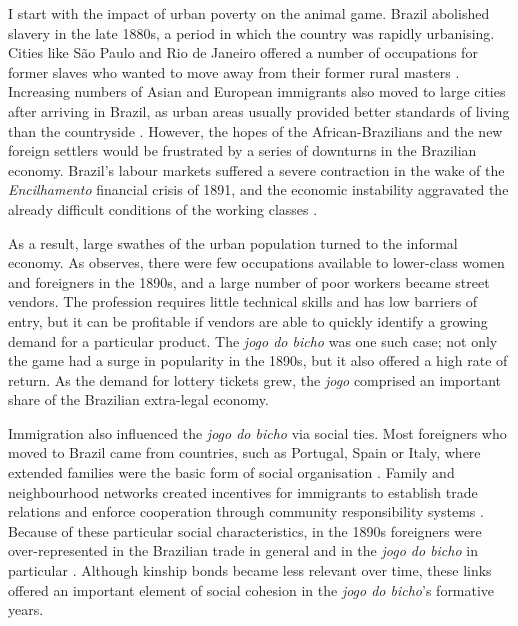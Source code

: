 \documentclass[a4paper,12pt]{article}
\begin{document}
I start with the impact of urban poverty on the animal game. Brazil abolished slavery in the late 1880s, a period in which the country was rapidly urbanising. Cities like São Paulo and Rio de Janeiro offered a number of occupations for former slaves who wanted to move away from their former rural masters \citep{andrews1991blacks, skidmore1993black}. Increasing numbers of Asian and European immigrants also moved to large cities after arriving in Brazil, as urban areas usually provided better standards of living than the countryside \citep{hall1969origins, lesser2013immigration}. However, the hopes of the African-Brazilians and the new foreign settlers would be frustrated by a series of downturns in the Brazilian economy. Brazil's labour markets suffered a severe contraction in the wake of the \textit{Encilhamento} financial crisis of 1891, and the economic instability aggravated the already difficult conditions of the working classes \citep{topik2014political, triner2005baring}.

As a result, large swathes of the urban population turned to the informal economy. As \citet[115]{chazkel2011laws} observes, there were few occupations available to lower-class women and foreigners in the 1890s, and a large number of poor workers became street vendors. The profession requires little technical skills and has low barriers of entry, but it can be profitable if vendors are able to quickly identify a growing demand for a particular product. The \textit{jogo do bicho} was one such case; not only the game had a surge in popularity in the 1890s, but it also offered a high rate of return. As the demand for lottery tickets grew, the \textit{jogo} comprised an important share of the Brazilian extra-legal economy.

Immigration also influenced the \textit{jogo do bicho} via social ties. Most foreigners who moved to Brazil came from countries, such as Portugal, Spain or Italy, where extended families were the basic form of social organisation \citep{lobo2001imigraccao, trento1989outro}. Family and neighbourhood networks created incentives for immigrants to establish trade relations and enforce cooperation through community responsibility systems \citep{roth2014prison}. Because of these particular social characteristics, in the 1890s foreigners were over-represented in the Brazilian trade in general \citep{mattos1991vadios, oliveira2001brasil} and in the \textit{jogo do bicho} in particular \citep{magalhaes2005ganhou, villar2008contravencao}. Although kinship bonds became less relevant over time, these links offered an important element of social cohesion in the \textit{jogo do bicho}'s formative years.
\end{document}
